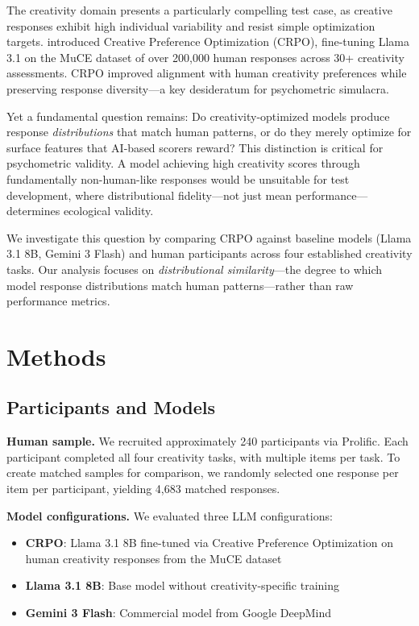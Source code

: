 \documentclass[11pt,twocolumn]{article}
\begin{document}
The creativity domain presents a particularly compelling test case, as creative responses exhibit high individual variability and resist simple optimization targets. \citet{ismayilzada2025crpo} introduced Creative Preference Optimization (CRPO), fine-tuning Llama 3.1 on the MuCE dataset of over 200,000 human responses across 30+ creativity assessments. CRPO improved alignment with human creativity preferences while preserving response diversity---a key desideratum for psychometric simulacra.

Yet a fundamental question remains: Do creativity-optimized models produce response \textit{distributions} that match human patterns, or do they merely optimize for surface features that AI-based scorers reward? This distinction is critical for psychometric validity. A model achieving high creativity scores through fundamentally non-human-like responses would be unsuitable for test development, where distributional fidelity---not just mean performance---determines ecological validity.

We investigate this question by comparing CRPO against baseline models (Llama 3.1 8B, Gemini 3 Flash) and human participants across four established creativity tasks. Our analysis focuses on \textit{distributional similarity}---the degree to which model response distributions match human patterns---rather than raw performance metrics.

\section{Methods}

\subsection{Participants and Models}

\textbf{Human sample.} We recruited approximately 240 participants via Prolific. Each participant completed all four creativity tasks, with multiple items per task. To create matched samples for comparison, we randomly selected one response per item per participant, yielding 4,683 matched responses.

\textbf{Model configurations.} We evaluated three LLM configurations:
\begin{itemize}
    \item \textbf{CRPO}: Llama 3.1 8B fine-tuned via Creative Preference Optimization on human creativity responses from the MuCE dataset \citep{ismayilzada2025crpo}
    \item \textbf{Llama 3.1 8B}: Base model without creativity-specific training
    \item \textbf{Gemini 3 Flash}: Commercial model from Google DeepMind
\end{itemize}
\end{document}
